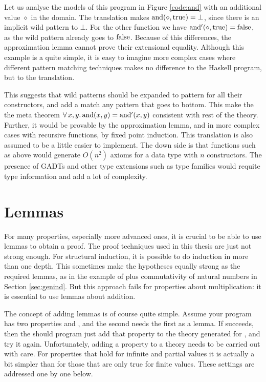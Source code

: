 Let us analyse the models of this program in Figure \ref{code:and}
with an additional value $\diamond$ in the domain. The translation
makes $\mathrm{and}(\diamond,\mathrm{true}) = \bot$, since there is an
implicit wild pattern to $\bot$. For the other function we have
$\mathrm{and'}(\diamond,\mathrm{true}) = \mathrm{false}$, as the wild pattern
already goes to $\mathrm{false}$. Because of this differences, the
approximation lemma cannot prove their extensional equality. Although
this example is a quite simple, it is easy to imagine more complex
cases where different pattern matching techniques makes no difference
to the Haskell program, but to the translation.

This suggests that wild patterns should be expanded to pattern for all
their constructors, and add a match any pattern that goes to
bottom. This make the the meta theorem $\forall \, x , y . \, \mathrm{and}(x,y) =
\mathrm{and'}(x,y)$ consistent with rest of the theory.  Further, it would
be provable by the approximation lemma, and in more complex cases with
recursive functions, by fixed point induction. This translation is
also assumed to be a little easier to implement. The down side is that
functions such as  above would generate $O(n^2)$ axioms for
a data type with $n$ constructors. The presence of GADTs and other
type extensions such as type families would requite type information
and add a lot of complexity.

\section{Lemmas}

For many properties, especially more advanced ones, it is crucial to
be able to use lemmas to obtain a proof. The proof techniques used in
this thesis are just not strong enough. For structural induction, it
is possible to do induction in more than one depth. This sometimes
make the hypotheses equally strong as the required lemmas, as in the
example of plus commutativity of natural numbers in Section
\ref{sec:genind}. But this approach fails for properties about
multiplication: it is essential to use lemmas about addition.

The concept of adding lemmas is of course quite simple. Assume your
program has two properties  and , and the
second needs the first as a lemma. If  succeeds, then the
should program just add that property to the theory generated for
, and try it again. Unfortunately, adding a property to a
theory needs to be carried out with care. For properties that hold for
infinite and partial values it is actually a bit simpler than for
those that are only true for finite values. These settings are
addressed one by one below.

